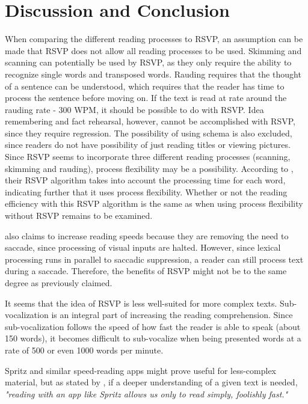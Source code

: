 \section{\fontsize{12}{15}\selectfont Discussion and Conclusion}
When comparing the different reading processes to RSVP, an assumption can be made that RSVP does not allow all reading processes to be used. Skimming and scanning can potentially be used by RSVP, as they only require the ability to recognize single words and transposed words. Rauding requires that the thought of a sentence can be understood, which requires that the reader has time to process the sentence before moving on. If the text is read at rate around the rauding rate - 300 WPM, it should be possible to do with RSVP.   Idea remembering and fact rehearsal, however, cannot be accomplished with RSVP, since they require regression. The possibility of using schema is also excluded, since readers do not have possibility of just reading titles or viewing pictures.
Since RSVP seems to incorporate three different reading processes (scanning, skimming and rauding), process flexibility may be a possibility. According to \cite{spritz}, their RSVP algorithm takes into account the processing time for each word, indicating further that it uses process flexibility. Whether or not the reading efficiency with this RSVP algorithm is the same as when using process flexibility without RSVP remains to be examined.

 also claims to increase reading speeds because they are removing the need to saccade, since processing of visual inputs are halted. However, since lexical processing runs in parallel 
to saccadic suppression, a reader can still process text during a saccade. Therefore, the benefits of RSVP might not be to the same degree as previously claimed.

It seems that the idea of RSVP is less well-suited for more complex texts. Sub-vocalization is an integral part of increasing the reading comprehension. Since sub-vocalization follows the speed of how fast the reader is able to speak (about 150 words), it becomes difficult to sub-vocalize when being presented words at a rate of 500 or even 1000 words per minute. 

Spritz and similar speed-reading apps might prove useful for less-complex material, but as stated by , if a deeper understanding of a given text is needed, \emph{"reading with an app like Spritz allows us only to read simply, foolishly fast."}

